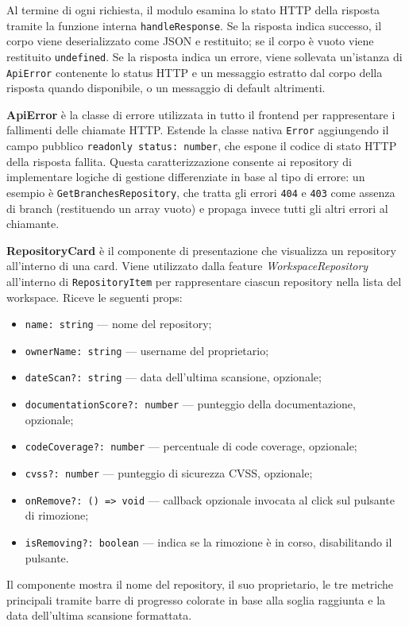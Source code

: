 \documentclass[a4paper, 11pt]{article}
\newcounter{subsubsubsection}[subsubsection]
\begin{document}
Al termine di ogni richiesta, il modulo esamina lo stato HTTP della risposta
tramite la funzione interna \texttt{handleResponse}. Se la risposta indica
successo, il corpo viene deserializzato come JSON e restituito; se il corpo
è vuoto viene restituito \texttt{undefined}. Se la risposta indica un errore,
viene sollevata un'istanza di \texttt{ApiError} contenente lo status HTTP e un
messaggio estratto dal corpo della risposta quando disponibile, o un messaggio
di default altrimenti.


\textbf{ApiError} è la classe di errore utilizzata in tutto il frontend per
rappresentare i fallimenti delle chiamate HTTP. Estende la classe nativa
\texttt{Error} aggiungendo il campo pubblico \texttt{readonly status: number},
che espone il codice di stato HTTP della risposta fallita. Questa
caratterizzazione consente ai repository di implementare logiche di gestione
differenziate in base al tipo di errore: un esempio è
\texttt{GetBranchesRepository}, che tratta gli errori \texttt{404} e
\texttt{403} come assenza di branch (restituendo un array vuoto) e propaga
invece tutti gli altri errori al chiamante.


\textbf{RepositoryCard} è il componente di presentazione che visualizza un
repository all'interno di una card. Viene utilizzato dalla feature
\textit{WorkspaceRepository} all'interno di \texttt{RepositoryItem} per
rappresentare ciascun repository nella lista del workspace. Riceve le seguenti
props:
\begin{itemize}
  \item \texttt{name: string} — nome del repository;
  \item \texttt{ownerName: string} — username del proprietario;
  \item \texttt{dateScan?: string} — data dell'ultima scansione, opzionale;
  \item \texttt{documentationScore?: number} — punteggio della documentazione,
        opzionale;
  \item \texttt{codeCoverage?: number} — percentuale di code coverage,
        opzionale;
  \item \texttt{cvss?: number} — punteggio di sicurezza CVSS, opzionale;
  \item \texttt{onRemove?: () => void} — callback opzionale invocata al click
        sul pulsante di rimozione;
  \item \texttt{isRemoving?: boolean} — indica se la rimozione è in corso,
        disabilitando il pulsante.
\end{itemize}
Il componente mostra il nome del repository, il suo proprietario, le tre
metriche principali tramite barre di progresso colorate in base alla soglia
raggiunta e la data dell'ultima scansione formattata.
\end{document}
